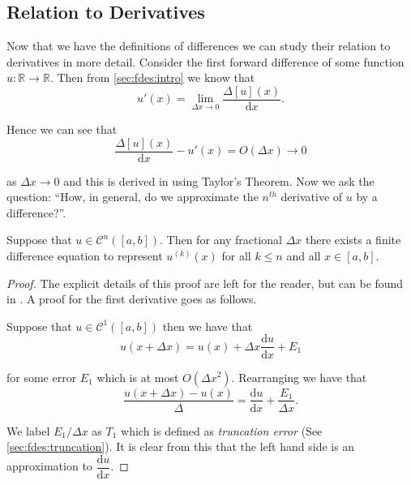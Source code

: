 \documentclass[../main.tex]{subfiles}
\begin{document}
  \subsection{Relation to Derivatives}\label{sec:fdes:relation}
  Now that we have the definitions of differences we can study their relation to derivatives in more detail. Consider the first forward difference of some function $u: \mathbb{R} \to \mathbb{R}$. Then from \autoref{sec:fdes:intro} we know that \\

  \begin{equation}
    u'(x)
    = \lim_{\Delta x \to 0} \frac{\Delta[u](x)}{\mathrm{d}x}.
  \end{equation}

  Hence we can see that \\

  \begin{equation}
    \frac{\Delta[u](x)}{\mathrm{d}x} - u'(x) = O(\Delta x) \to 0
  \end{equation}

  as $\Delta x \to 0$ and this is derived in \cite{hildebrand1987} using Taylor's Theorem. Now we ask the question: ``How, in general, do we approximate the $n^{th}$ derivative of $u$ by a difference?''.

  \begin{theorem}
    Suppose that $u \in \mathcal{C}^n([a, b])$. Then for any fractional $\Delta x$ there exists a finite difference equation to represent $u^{(k)}(x)$ for all $k \leq n$ and all $x \in [a, b]$.

    \begin{proof}
      The explicit details of this proof are left for the reader, but can be found in \cite{fornberg1988}. A proof for the first derivative goes as follows.

      Suppose that $u \in \mathcal{C}^1([a, b])$ then we have that\\

      \begin{equation}
        u(x + \Delta x) = u(x) + \Delta x \frac{\mathrm{d}u}{\mathrm{d}x} + E_1
      \end{equation}

      for some error $E_1$ which is at most $O(\Delta x^2)$. Rearranging we have that \\

      \begin{equation}
        \frac{u(x + \Delta x) - u(x)}{\Delta} = \frac{\mathrm{d}u}{\mathrm{d}x} + \frac{E_1}{\Delta x}.
      \end{equation}

      We label $E_1 / \Delta x$ as $T_1$ which is defined as \emph{truncation error} (See \autoref{sec:fdes:truncation}). It is clear from this that the left hand side is an approximation to $\dfrac{\mathrm{d}u}{\mathrm{d}x}$.
    \end{proof}
  \end{theorem}
\end{document}
